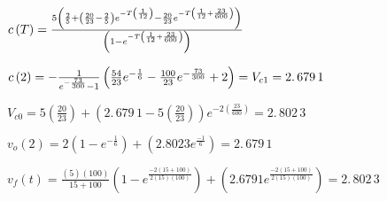 \documentclass{article}
\begin{document}
$c\left( T\right) =\frac{5\left( \frac{2}{5}+\left( \frac{20}{23}-\frac{2}{5}%
\right) e^{-T\left( \frac{1}{12}\right) }-\frac{20}{23}e^{-T\left( \frac{1}{%
12}+\frac{23}{600}\right) }\right) }{\left( 1-e^{-T\left( \frac{1}{12}+\frac{%
23}{600}\right) }\right) }$

$c\left( 2\right) =\allowbreak -\frac{1}{e^{-\frac{73}{300}}-1}\left( \frac{%
54}{23}e^{-\frac{1}{6}}-\frac{100}{23}e^{-\frac{73}{300}}+2\right)
\allowbreak =V_{c1}\allowbreak =2.\,\allowbreak 679\,1$

$V_{c0}=5\left( \frac{20}{23}\right) +\left( 2.\,\allowbreak 679\,1-5\left( 
\frac{20}{23}\right) \right) e^{-2\left( \frac{23}{600}\right) }=\allowbreak
2.\,\allowbreak 802\,3$

$v_{o}\left( 2\right) =2\left( 1-e^{-\frac{1}{6}}\right) +\left( \allowbreak
2.8023e^{\frac{-1}{6}}\right) =\allowbreak 2.\,\allowbreak 679\,1$

$v_{f}\left( t\right) =\frac{\left( 5\right) \left( 100\right) }{15+100}%
\left( 1-e^{\frac{-2\left( 15+100\right) }{2\left( 15\right) \left(
100\right) }}\right) +\left( 2.6791e^{\frac{-2\left( 15+100\right) }{2\left(
15\right) \left( 100\right) }}\right) =\allowbreak 2.\,\allowbreak 802\,3$
\end{document}
